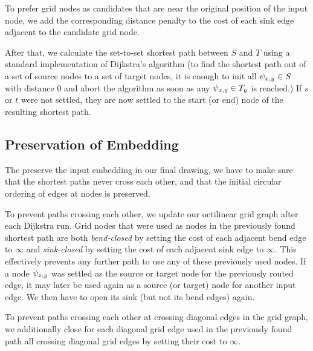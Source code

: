 \documentclass[sigconf]{acmart}
\begin{document}
To prefer grid nodes as candidates that are near the original position of the input node, we add the corresponding distance penalty to the cost of each sink edge adjacent to the candidate grid node.

After that, we calculate the set-to-set shortest path between $S$ and $T$ using a standard implementation of Dijkstra's algorithm (to find the shortest path out of a set of source nodes to a set of target nodes, it is enough to init all $\psi_{x, y} \in S$ with distance 0 and abort the algorithm as soon as any $\psi_{x, y} \in T_g$ is reached.)
If $s$ or $t$ were not settled, they are now settled to the start (or end) node of the resulting shortest path.

\subsection{Preservation of Embedding}

The preserve the input embedding in our final drawing, we have to make sure that the shortest paths never cross each other, and that the initial circular ordering of edges at nodes is preserved.

To prevent paths crossing each other, we update our octilinear grid graph after each Dijkstra run.
Grid nodes that were used as nodes in the previously found shortest path are both \emph{bend-closed} by setting the cost of each adjacent bend edge to $\infty$ and \emph{sink-closed} by setting the cost of each adjacent sink edge to $\infty$.
This effectively prevents any further path to use any of these previously used nodes.
If a node $\psi_{x, y}$ was settled as the source or target node for the previously routed edge, it may later be used again as a source (or target) node for another input edge.
We then have to open its sink (but not its bend edges) again.

To prevent paths crossing each other at crossing diagonal edges in the grid graph, we additionally close for each diagonal grid edge used in the previously found path all crossing diagonal grid edges by setting their cost to $\infty$.
\end{document}
